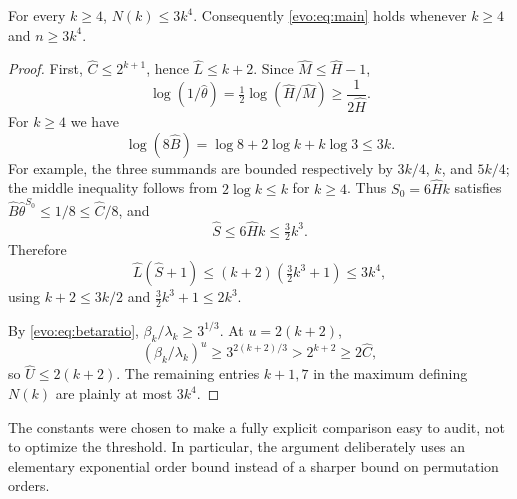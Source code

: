 \documentclass[11pt,a4paper]{article}
\numberwithin{equation}{section}
\theoremstyle{definition}
\theoremstyle{remark}
\begin{document}
\begin{corollary}[Manuscript~06]\label{evo:cor:quartic}
For every $k\ge4$, $N(k)\le3k^4$. Consequently \eqref{evo:eq:main} holds
whenever $k\ge4$ and $n\ge3k^4$.
\end{corollary}
\begin{proof}
First, $\hat C\le2^{k+1}$, hence $\hat L\le k+2$. Since $\hat M\le\hat H-1$,
\[
 \log(1/\hat\theta)=\tfrac12\log(\hat H/\hat M)\ge\frac1{2\hat H}.
\]
For $k\ge4$ we have
\[
 \log(8\hat B)=\log8+2\log k+k\log3\le3k.
\]
For example, the three summands are bounded respectively by $3k/4$, $k$, and
$5k/4$; the middle inequality follows from $2\log k\le k$ for $k\ge4$. Thus
$S_0=6\hat Hk$ satisfies $\hat B\hat\theta^{S_0}\le1/8\le\hat C/8$, and
\[
 \hat S\le6\hat Hk\le\tfrac32k^3.
\]
Therefore
\[
 \hat L(\hat S+1)\le(k+2)(\tfrac32k^3+1)\le3k^4,
\]
using $k+2\le3k/2$ and $\tfrac32k^3+1\le2k^3$.

By \eqref{evo:eq:betaratio}, $\beta_k/\lambda_k\ge3^{1/3}$. At $u=2(k+2)$,
\[
 (\beta_k/\lambda_k)^u\ge3^{2(k+2)/3}>2^{k+2}\ge2\hat C,
\]
so $\hat U\le2(k+2)$. The remaining entries $k+1,7$ in the maximum defining
$N(k)$ are plainly at most $3k^4$.
\end{proof}

The constants were chosen to make a fully explicit comparison easy to audit,
not to optimize the threshold. In particular, the argument deliberately uses
an elementary exponential order bound instead of a sharper bound on
permutation orders.
\end{document}
